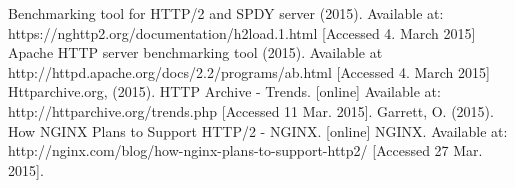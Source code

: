 \documentclass{article}
\begin{document}
\begin{thebibliography}
 Benchmarking tool for HTTP/2 and SPDY server (2015). Available at: https://nghttp2.org/documentation/h2load.1.html [Accessed 4. March 2015]
 Apache HTTP server benchmarking tool (2015). Available at http://httpd.apache.org/docs/2.2/programs/ab.html [Accessed 4. March 2015]
 Httparchive.org, (2015). HTTP Archive - Trends. [online] Available at: http://httparchive.org/trends.php [Accessed 11 Mar. 2015].
Garrett, O. (2015). How NGINX Plans to Support HTTP/2 - NGINX. [online] NGINX. Available at: http://nginx.com/blog/how-nginx-plans-to-support-http2/ [Accessed 27 Mar. 2015].

\end{thebibliography}
\end{document}
